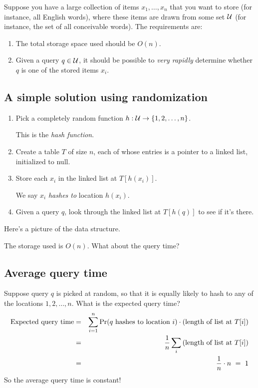 Suppose you have a large collection of items $x_1, \ldots, x_n$ that you want 
to store (for instance, all English words), where these items are 
drawn from some set ${\cal U}$ (for instance, the set of all conceivable words). 
The requirements are:
\begin{enumerate}
\item The total storage space used should be $O(n)$.
\item Given a query $q \in {\cal U}$, it should be possible to {\it very rapidly}
determine whether $q$ is one of the stored items $x_i$.
\end{enumerate}

\subsection{A simple solution using randomization}

\begin{enumerate}
\item Pick a completely random function $h: {\cal U} \rightarrow \{1,2,\ldots, n\}$. 

This is the {\it hash function}. 

\item Create a table $T$ of size $n$, each of whose entries is a pointer to a 
linked list, initialized to null. 

\item Store each $x_i$ in the linked list at $T[h(x_i)]$.

We say $x_i$ {\it hashes to} location $h(x_i)$.

\item Given a query $q$, look through the linked list at $T[h(q)]$ to see if
it's there.
\end{enumerate}

Here's a picture of the data structure.

\begin{center}
\end{center}

The storage used is $O(n)$. What about the query time?

\subsection{Average query time}

Suppose query $q$ is picked at random, so that it is equally likely to hash to
any of the locations $1,2,\ldots, n$. What is the expected query time?
\begin{eqnarray*}
\mbox{Expected query time}
& =& 
\sum_{i=1}^n \mbox{\rm Pr}(\mbox{$q$ hashes to location $i$}) \cdot \mbox{(length of list at $T[i]$)} \\
& =&
\frac{1}{n} \sum_i  \mbox{(length of list at $T[i]$)} \\ 
& = & 
\frac{1}{n} \cdot n \ = \ 1
\end{eqnarray*}
So the average query time is constant!

